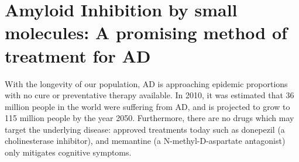 



\section{Amyloid Inhibition by small molecules: A promising method of treatment for AD} 

With the longevity of our population, AD is approaching epidemic proportions with no cure or preventative therapy available.\cite{Blennow:2006wd} In 2010, it was estimated that 36 million people in the world were suffering from AD, and is projected to grow to 115 million people by the year 2050.\cite{alzreport:2012} Furthermore, there are no drugs which may target the underlying disease: approved treatments today such as donepezil (a cholinesterase inhibitor), and memantine (a N-methyl-D-aspartate antagonist) only mitigates cognitive symptoms.\cite{Mangialasche:2010eg}


